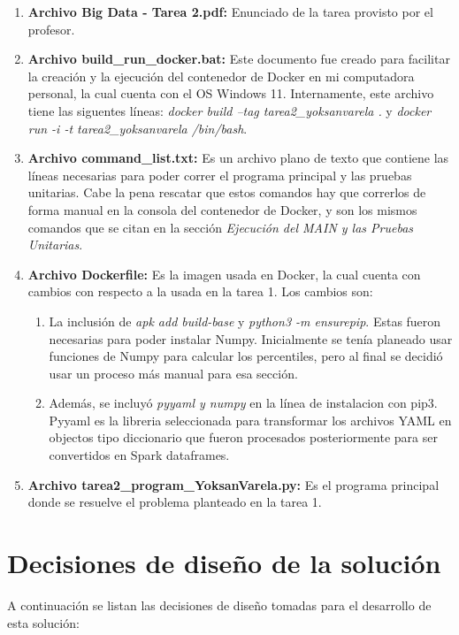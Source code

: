 \documentclass[a4paper]{article}
\begin{document}
\begin{enumerate}
    \item \textbf{Archivo Big Data - Tarea 2.pdf:} Enunciado de la tarea provisto por el profesor.
    
    \item \textbf{Archivo build\_run\_docker.bat:} Este documento fue creado para facilitar la creaci\'{o}n y la ejecuci\'{o}n del contenedor de Docker en mi computadora personal, la cual cuenta con el OS Windows 11. Internamente, este archivo tiene las siguentes l\'{i}neas: \textit{ docker build --tag tarea2\_yoksanvarela .} y \textit{ docker run -i -t tarea2\_yoksanvarela /bin/bash}.
    
    \item \textbf{Archivo command\_list.txt:} Es un archivo plano de texto que contiene las l\'{i}neas necesarias para poder correr el programa principal y las pruebas unitarias. Cabe la pena rescatar que estos comandos hay que correrlos de forma manual en la consola del contenedor de Docker, y son los mismos comandos que se citan en la secci\'{o}n \textit{Ejecuci\'{o}n del MAIN y las Pruebas Unitarias}.
    
    \item \textbf{Archivo Dockerfile:} Es la imagen usada en Docker, la cual cuenta con cambios con respecto a la usada en la tarea 1. Los cambios son:

    \begin{enumerate}
        \item La inclusi\'{o}n de \textit{apk add build-base} y \textit{python3 -m ensurepip}. Estas fueron necesarias para poder instalar Numpy. Inicialmente se ten\'{i}a planeado usar funciones de Numpy para calcular los percentiles, pero al final se decidi\'{o} usar un proceso m\'{a}s manual para esa secci\'{o}n. 
        \item Adem\'{a}s, se incluy\'{o} \textit{pyyaml y numpy} en la l\'{i}nea de instalacion con pip3. Pyyaml es la libreria seleccionada para transformar los archivos YAML en objectos tipo diccionario que fueron procesados posteriormente para ser convertidos en Spark dataframes.
    \end{enumerate}
    
    \item \textbf{Archivo tarea2\_program\_YoksanVarela.py:} Es el programa principal donde se resuelve el problema planteado en la tarea 1.
    
\end{enumerate}

\section{Decisiones de dise\~{n}o de la soluci\'{o}n}
A continuaci\'{o}n se listan las decisiones de dise\~{n}o tomadas para el desarrollo de esta soluci\'{o}n:
\end{document}
